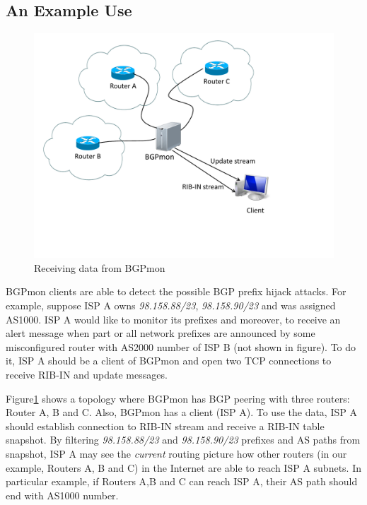 \subsection{An Example Use}


\begin{figure}
\centering
\includegraphics[scale=0.30]{figs/BGPmon-peers-with-client.pdf}
\caption{Receiving data from BGPmon}
\label{bgpmonclient}
\end{figure}

BGPmon clients are able to detect the possible BGP prefix hijack attacks.  For example,  suppose ISP A owns \emph{98.158.88/23}, \emph{98.158.90/23} and was assigned AS1000.  ISP A would like to monitor its prefixes and moreover, to receive an alert message when part or all network prefixes are announced by some misconfigured router with AS2000 number of ISP B (not shown in figure). To do it, ISP A should be a client of BGPmon and open two TCP connections to receive RIB-IN and update messages.

Figure\ref{bgpmonclient} shows a topology where BGPmon has BGP peering with three routers: Router A, B and C. Also, BGPmon has a client (ISP A).    To use the data, ISP A should establish connection to RIB-IN stream and receive a RIB-IN table snapshot. By filtering \emph{98.158.88/23} and \emph{98.158.90/23} prefixes and AS paths from snapshot, ISP A may see the \emph{current} routing picture how other routers (in our example, Routers A, B and C) in the Internet are able to reach ISP A subnets. In particular example, if Routers A,B and C can reach ISP A, their AS path should end with AS1000 number.

